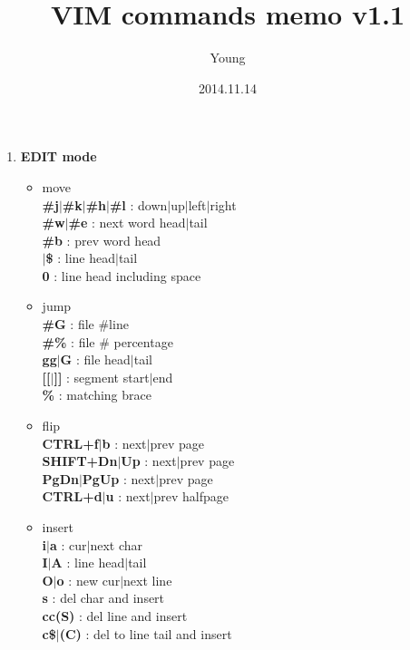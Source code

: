\documentclass[10pt, a4paper]{article}
\begin{document}
\twocolumn

\pagestyle{empty}
\title{VIM commands memo v1.1}
\author{Young}
\date{2014.11.14}
\maketitle
\thispagestyle{empty} %

\setlength{\baselineskip}{12pt} %

\begin{enumerate}
\item{\textbf{EDIT mode}}
    \begin{itemize}
    \item move \\
    \textbf{\#j{$|$}\#k{$|$}\#h{$|$}\#l} : down{$|$}up{$|$}left{$|$}right \\
    \textbf{\#w{$|$}\#e} : next word head{$|$}tail \\
    \textbf{\#b} : prev word head \\ 
    \textbf{\^{$|$}\$} : line head{$|$}tail \\ 
    \textbf{0} : line head including space
    \item jump \\
    \textbf{\#G} : file \#line \\
    \textbf{\#\%} : file \# percentage \\ 
    \textbf{gg{$|$}G} : file head{$|$}tail \\ 
    \textbf{[[{$|$}]]} : segment start{$|$}end \\
    \textbf{\%} : matching brace
    \item flip \\
    \textbf{CTRL+f{$|$}b} : next{$|$}prev page \\
    \textbf{SHIFT+Dn{$|$}Up} : next{$|$}prev page \\
    \textbf{PgDn{$|$}PgUp} : next{$|$}prev page \\
    \textbf{CTRL+d{$|$}u} : next{$|$}prev halfpage
    \item insert \\
    \textbf{i{$|$}a} : cur{$|$}next char \\
    \textbf{I{$|$}A} : line head{$|$}tail \\
    \textbf{O{$|$}o} : new cur{$|$}next line \\ 
    \textbf{s} : del char and insert \\ 
    \textbf{cc(S)} : del line and insert \\
    \textbf{c\${$|$}(C)} : del to line tail and insert

\end{itemize}
\end{enumerate}
\end{document}
